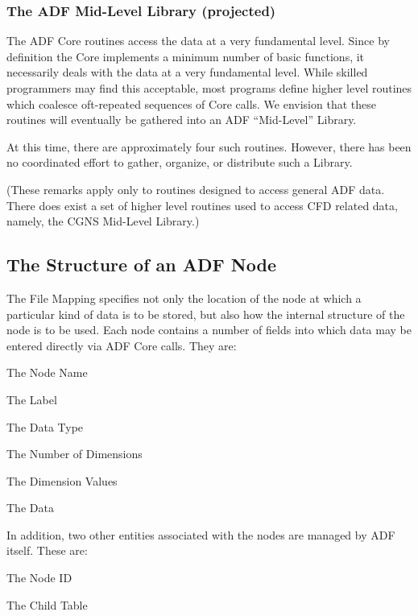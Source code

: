 \subsubsection{The ADF Mid-Level Library (projected)}

The ADF Core routines access the data at a very fundamental level. Since
by definition the Core implements a minimum number of basic functions,
it necessarily deals with the data at a very fundamental level. While
skilled programmers may find this acceptable, most programs define
higher level routines which coalesce oft-repeated sequences of Core
calls. We envision that these routines will eventually be gathered into
an ADF ``Mid-Level'' Library.

At this time, there are approximately four such routines. However, there
has been no coordinated effort to gather, organize, or distribute such a
Library.

(These remarks apply only to routines designed to access general ADF
data. There does exist a set of higher level routines used to access CFD
related data, namely, the CGNS Mid-Level Library.)

\subsection{The Structure of an ADF Node}
\label{s:adfnodestructure}

The File Mapping specifies not only the location of the node at which
a particular kind of data is to be stored, but also how the internal
structure of the node is to be used. Each node contains a number of
fields into which data may be entered directly via ADF Core calls. They
are:

\begin{itemize*}
\item The Node Name
\item The Label
\item The Data Type
\item The Number of Dimensions
\item The Dimension Values
\item The Data
\end{itemize*}
In addition, two other entities associated with the nodes are managed by
ADF itself. These are:
\begin{itemize*}
\item The Node ID
\item The Child Table
\end{itemize*}


